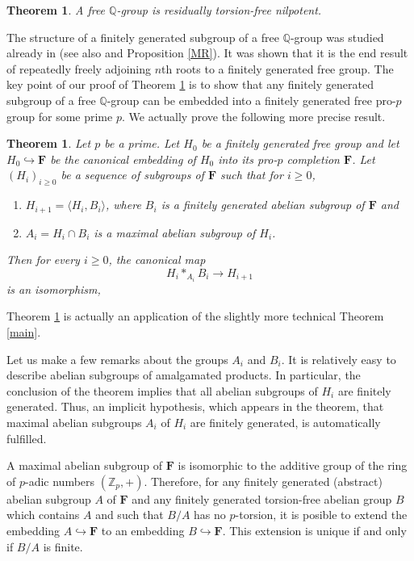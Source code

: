 \documentclass[11pt]{amsart}
\newtheorem{teo}[lem]{Theorem}
\numberwithin{claimcounter}{lem}
\newcommand{\Z}{\mathbb{Z}}
\newcommand{\Q}{\mathbb{Q}}
\begin{document}
 \begin{teo} \label{teoBau} A free $\Q$-group is  residually torsion-free nilpotent.
 \end{teo}
The structure of a finitely generated subgroup of a free $\Q$-group was studied already in \cite{Ba60} (see also \cite[Section 8]{MR96} and Proposition \ref{MR}). It was shown that it is  the end result of repeatedly freely adjoining $n$th roots to a finitely generated  free group. 
The key point of our   proof of Theorem \ref{teoBau} is to show  that any finitely generated subgroup  of a free $\Q$-group can be embedded into a finitely generated free pro-$p$ group for some prime $p$. 
We actually  prove the following more precise result.
\begin{teo}\label{iteratedextension} Let $p$ be a prime.
Let $H_0$ be a finitely generated free group  and let $H_0\hookrightarrow \mathbf F$ be the canonical embedding of $H_0$ into its pro-$p$ completion $ \mathbf F$. Let $(H_{i})_{i\ge 0}$ be a sequence of subgroups of  $\mathbf F$ such that for $i\ge 0$,
\begin{enumerate}
\item $H_{i+1}=\langle H_i, B_i\rangle $, where   $B_{i}$ is a finitely generated  abelian subgroup of $\mathbf F$ and 
\item $A_i=H_i\cap B_i$ is  a maximal abelian subgroup of $H_{i}$.
\end{enumerate}
Then  for every $i\ge 0$, the canonical map $$H_{i}*_{A_{i}}B_{i}\to H_{i+1}$$ is an isomorphism,
\end{teo}
Theorem \ref{iteratedextension} is actually an application of the slightly more technical Theorem \ref{main}.

Let us make a few remarks about the groups $A_i$ and $B_i$.
It is relatively easy to describe  abelian subgroups of amalgamated products. In particular,  the conclusion of  the theorem  implies  that all  abelian subgroups of $H_i$ are finitely generated. Thus, an implicit hypothesis, which appears in the theorem,  that maximal abelian subgroups $A_i$ of $H_i$ are finitely generated, is automatically fulfilled.

A maximal abelian subgroup of $\mathbf F$  is isomorphic to the additive group of the ring of $p$-adic numbers $(\Z_p,+)$. Therefore, for any finitely generated (abstract) abelian subgroup $A$ of $\mathbf F$  and any finitely generated torsion-free abelian group $B$ which contains $A$ and such that $B/A$ has no $p$-torsion, it is posible to extend the embedding  $A\hookrightarrow \mathbf F$ to an embedding $B\hookrightarrow \mathbf F$. This extension is   unique if and only if   $B/A$ is finite. 
\end{document}
